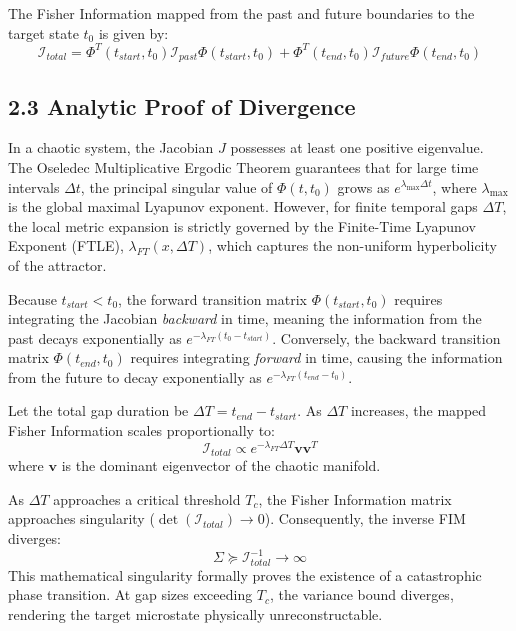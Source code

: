 \documentclass[aps,prl,reprint,superscriptaddress,nofootinbib]{revtex4-2}
\begin{document}
The Fisher Information mapped from the past and future boundaries to the target state $t_0$ is given by:
\begin{equation}
\mathcal{I}_{total} = \Phi^T(t_{start}, t_0) \mathcal{I}_{past} \Phi(t_{start}, t_0) + \Phi^T(t_{end}, t_0) \mathcal{I}_{future} \Phi(t_{end}, t_0)
\end{equation}

\subsection{2.3 Analytic Proof of Divergence}
In a chaotic system, the Jacobian $J$ possesses at least one positive eigenvalue. The Oseledec Multiplicative Ergodic Theorem guarantees that for large time intervals $\Delta t$, the principal singular value of $\Phi(t, t_0)$ grows as $e^{\lambda_{\max} \Delta t}$, where $\lambda_{\max}$ is the global maximal Lyapunov exponent. However, for finite temporal gaps $\Delta T$, the local metric expansion is strictly governed by the Finite-Time Lyapunov Exponent (FTLE), $\lambda_{FT}(x, \Delta T)$, which captures the non-uniform hyperbolicity of the attractor.

Because $t_{start} < t_0$, the forward transition matrix $\Phi(t_{start}, t_0)$ requires integrating the Jacobian \textit{backward} in time, meaning the information from the past decays exponentially as $e^{-\lambda_{FT} (t_0 - t_{start})}$. Conversely, the backward transition matrix $\Phi(t_{end}, t_0)$ requires integrating \textit{forward} in time, causing the information from the future to decay exponentially as $e^{-\lambda_{FT} (t_{end} - t_0)}$.

Let the total gap duration be $\Delta T = t_{end} - t_{start}$. As $\Delta T$ increases, the mapped Fisher Information scales proportionally to:
\begin{equation}
\mathcal{I}_{total} \propto e^{-\lambda_{FT} \Delta T} \mathbf{v} \mathbf{v}^T
\end{equation}
where $\mathbf{v}$ is the dominant eigenvector of the chaotic manifold.

As $\Delta T$ approaches a critical threshold $T_c$, the Fisher Information matrix approaches singularity ($\det(\mathcal{I}_{total}) \to 0$). Consequently, the inverse FIM diverges:
\begin{equation}
\Sigma \succeq \mathcal{I}_{total}^{-1} \to \infty
\end{equation}
This mathematical singularity formally proves the existence of a catastrophic phase transition. At gap sizes exceeding $T_c$, the variance bound diverges, rendering the target microstate physically unreconstructable.
\end{document}
